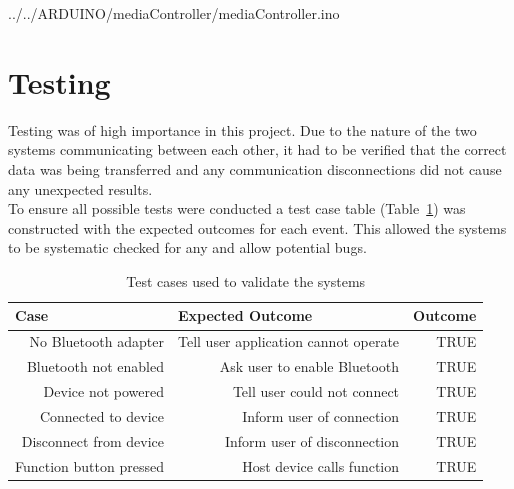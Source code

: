 \documentclass{article}
\begin{document}
			 {../../ARDUINO/mediaController/mediaController.ino}
			
	\section{Testing}
		Testing was of high importance in this project. Due to the nature of the two systems communicating between each other, it had to be verified that the correct data was being transferred and any communication disconnections did not cause any unexpected results.\\
		
		\noindent
		To ensure all possible tests were conducted a test case table (Table~\ref{testCase}) was constructed with the expected outcomes for each event. This allowed the systems to be systematic checked for any and allow potential bugs.
	
		\begin{table}[h]
			\centering
			\caption{Test cases used to validate the systems}
			\label{testCase}
			\begin{tabular}{|r|r|r|}
				\hline
				\multicolumn{1}{|l|}{Case} & \multicolumn{1}{l|}{Expected Outcome} & \multicolumn{1}{l|}{Outcome} \\ \hline
				No Bluetooth adapter      & Tell user application cannot operate          & TRUE                         \\
				Bluetooth not enabled     & Ask user to enable Bluetooth          & TRUE                         \\
				Device not powered         & Tell user could not connect           & TRUE                         \\
				Connected to device        & Inform user of connection             & TRUE                         \\
				Disconnect from device    & Inform user of disconnection          & TRUE                         \\
				Function button pressed    & Host device calls function            & TRUE                         \\ \hline
			\end{tabular}
		\end{table}
		
\end{document}
